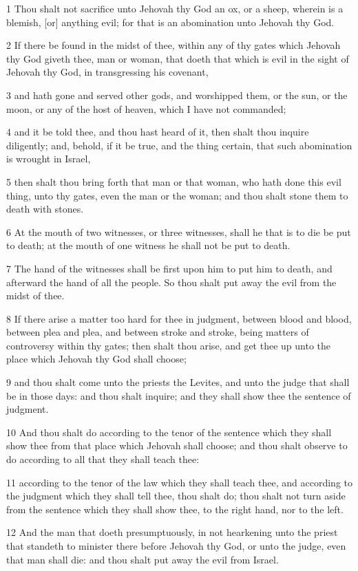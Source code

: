 \par 1 Thou shalt not sacrifice unto Jehovah thy God an ox, or a sheep, wherein is a blemish, [or] anything evil; for that is an abomination unto Jehovah thy God.
\par 2 If there be found in the midst of thee, within any of thy gates which Jehovah thy God giveth thee, man or woman, that doeth that which is evil in the sight of Jehovah thy God, in transgressing his covenant,
\par 3 and hath gone and served other gods, and worshipped them, or the sun, or the moon, or any of the host of heaven, which I have not commanded;
\par 4 and it be told thee, and thou hast heard of it, then shalt thou inquire diligently; and, behold, if it be true, and the thing certain, that such abomination is wrought in Israel,
\par 5 then shalt thou bring forth that man or that woman, who hath done this evil thing, unto thy gates, even the man or the woman; and thou shalt stone them to death with stones.
\par 6 At the mouth of two witnesses, or three witnesses, shall he that is to die be put to death; at the mouth of one witness he shall not be put to death.
\par 7 The hand of the witnesses shall be first upon him to put him to death, and afterward the hand of all the people. So thou shalt put away the evil from the midst of thee.
\par 8 If there arise a matter too hard for thee in judgment, between blood and blood, between plea and plea, and between stroke and stroke, being matters of controversy within thy gates; then shalt thou arise, and get thee up unto the place which Jehovah thy God shall choose;
\par 9 and thou shalt come unto the priests the Levites, and unto the judge that shall be in those days: and thou shalt inquire; and they shall show thee the sentence of judgment.
\par 10 And thou shalt do according to the tenor of the sentence which they shall show thee from that place which Jehovah shall choose; and thou shalt observe to do according to all that they shall teach thee:
\par 11 according to the tenor of the law which they shall teach thee, and according to the judgment which they shall tell thee, thou shalt do; thou shalt not turn aside from the sentence which they shall show thee, to the right hand, nor to the left.
\par 12 And the man that doeth presumptuously, in not hearkening unto the priest that standeth to minister there before Jehovah thy God, or unto the judge, even that man shall die: and thou shalt put away the evil from Israel.
